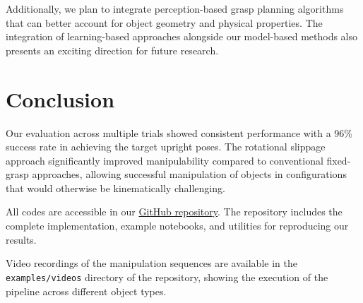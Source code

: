 \documentclass{article}
\begin{document}
Additionally, we plan to integrate perception-based grasp planning algorithms that can better account for object geometry and physical properties. The integration of learning-based approaches alongside our model-based methods also presents an exciting direction for future research.

\section{Conclusion}

Our evaluation across multiple trials showed consistent performance with a 96\% success rate in achieving the target upright poses. The rotational slippage approach significantly improved manipulability compared to conventional fixed-grasp approaches, allowing successful manipulation of objects in configurations that would otherwise be kinematically challenging.

All codes are accessible in our \href{https://github.com/VahidDanesh/pandaSim}{GitHub repository}. The repository includes the complete implementation, example notebooks, and utilities for reproducing our results. 

Video recordings of the manipulation sequences are available in the \texttt{examples/videos} directory of the repository, showing the execution of the pipeline across different object types.




\end{document}
